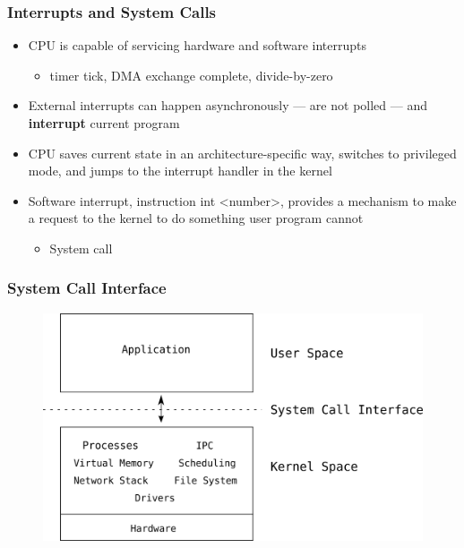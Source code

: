 \documentclass[11pt,xcolor=dvipsnames]{beamer}
\begin{document}
\begin{frame}[fragile,t]
\frametitle{Interrupts and System Calls}
\begin{itemize}
  \item CPU is capable of servicing hardware and software interrupts
  \begin{itemize}
    \item timer tick, DMA exchange complete, divide-by-zero
  \end{itemize}
  \pause
  \item External interrupts can happen asynchronously --- are not polled --- and \textbf{interrupt} current program
  \pause
  \item CPU saves current state in an architecture-specific way, switches to privileged mode, and jumps to the interrupt handler in the kernel
  \pause
  \item Software interrupt, instruction {\ttfamily int <number>}, provides a mechanism to make a request to the kernel to do something user program cannot
  \begin{itemize}
    \item System call
  \end{itemize}
\end{itemize}
\end{frame}

\begin{frame}[fragile,t]
\frametitle{System Call Interface}
\begin{figure}
\centering
\includegraphics[height=0.65\paperheight]{figures/monolithic.png}
\end{figure}
\end{frame}
\end{document}

